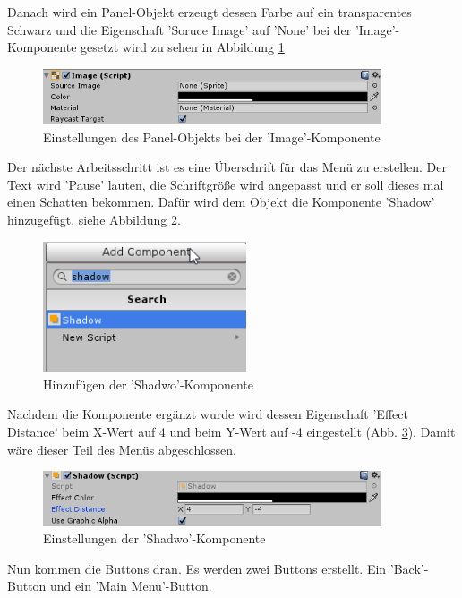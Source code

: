 Danach wird ein Panel-Objekt erzeugt dessen Farbe auf ein transparentes Schwarz und die Eigenschaft 'Soruce Image' auf 'None' bei der 'Image'-Komponente gesetzt wird zu sehen in Abbildung \ref{Panel Pause}

\begin{figure}[H]
	\includegraphics[width=10cm]{images/PanelPause.png}
	\caption{Einstellungen des Panel-Objekts bei der 'Image'-Komponente}
	\label{Panel Pause}
\end{figure}

Der nächste Arbeitsschritt ist es eine Überschrift für das Menü zu erstellen. Der Text wird 'Pause' lauten, die Schriftgröße wird angepasst und er soll dieses mal einen Schatten bekommen. Dafür wird dem Objekt die Komponente 'Shadow' hinzugefügt, siehe Abbildung \ref{addshadow}.

\begin{figure}[H]
	\includegraphics[width=6cm]{images/addshadow.png}
	\caption{Hinzufügen der 'Shadwo'-Komponente}
	\label{addshadow}
\end{figure}

Nachdem die Komponente ergänzt wurde wird dessen Eigenschaft 'Effect Distance' beim X-Wert auf 4 und beim Y-Wert auf -4 eingestellt (Abb. \ref{shadowSetup}). Damit wäre dieser Teil des Menüs abgeschlossen.
\begin{figure}[H]
	\includegraphics[width=10cm]{images/shadowSetup.png}
	\caption{Einstellungen der 'Shadwo'-Komponente}
	\label{shadowSetup}
\end{figure}

Nun kommen die Buttons dran. Es werden zwei Buttons erstellt. Ein  'Back'-Button und ein 'Main Menu'-Button. 

